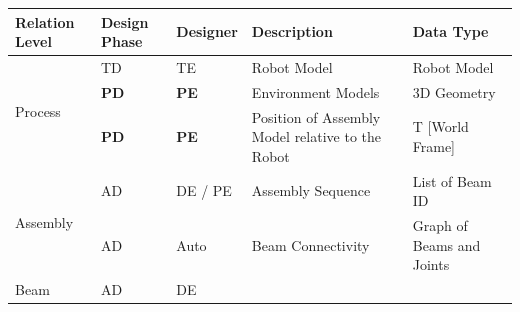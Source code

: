 \documentclass[11pt]{book}
\begin{document}
\begin{table}[H]
\begin{adjustbox}{max width=\textwidth}
\begin{tabular}{p{2.09cm}p{1.51cm}p{1.93cm}p{5.92cm}p{4.48cm}}
\hline
\multicolumn{1}{|p{2.09cm}}{{\footnotesize \textbf{Relation Level}}} & 
\multicolumn{1}{|p{1.51cm}}{{\footnotesize \textbf{Design Phase}}} & 
\multicolumn{1}{|p{1.93cm}}{{\footnotesize \textbf{Designer}}} & 
\multicolumn{1}{|p{5.92cm}}{{\footnotesize \textbf{Description}}} & 
\multicolumn{1}{|p{4.48cm}|}{{\footnotesize \textbf{Data Type}}} \\ 
\hline
\multicolumn{1}{|p{2.09cm}}{\multirow{3}{*}{\parbox{2.09cm}{{\footnotesize Process}}}} & 
\multicolumn{1}{|p{1.51cm}}{{\footnotesize TD}} & 
\multicolumn{1}{|p{1.93cm}}{{\footnotesize TE}} & 
\multicolumn{1}{|p{5.92cm}}{{\footnotesize Robot Model}} & 
\multicolumn{1}{|p{4.48cm}|}{{\footnotesize Robot Model}} \\ 
\hhline{~----}
\multicolumn{1}{|p{2.09cm}}{} & 
\multicolumn{1}{|p{1.51cm}}{{\footnotesize \textbf{PD}}} & 
\multicolumn{1}{|p{1.93cm}}{{\footnotesize \textbf{PE}}} & 
\multicolumn{1}{|p{5.92cm}}{{\footnotesize Environment Models}} & 
\multicolumn{1}{|p{4.48cm}|}{{\footnotesize 3D Geometry}} \\ 
\hhline{~----}
\multicolumn{1}{|p{2.09cm}}{} & 
\multicolumn{1}{|p{1.51cm}}{{\footnotesize \textbf{PD}}} & 
\multicolumn{1}{|p{1.93cm}}{{\footnotesize \textbf{PE}}} & 
\multicolumn{1}{|p{5.92cm}}{{\footnotesize Position of Assembly Model relative to the Robot }} & 
\multicolumn{1}{|p{4.48cm}|}{{\footnotesize T [World Frame]}} \\ 
\hline
\multicolumn{1}{|p{2.09cm}}{\multirow{2}{*}{\parbox{2.09cm}{{\footnotesize Assembly}}}} & 
\multicolumn{1}{|p{1.51cm}}{{\footnotesize AD}} & 
\multicolumn{1}{|p{1.93cm}}{{\footnotesize DE / PE}} & 
\multicolumn{1}{|p{5.92cm}}{{\footnotesize Assembly Sequence}} & 
\multicolumn{1}{|p{4.48cm}|}{{\footnotesize List of Beam ID}} \\ 
\hhline{~----}
\multicolumn{1}{|p{2.09cm}}{} & 
\multicolumn{1}{|p{1.51cm}}{{\footnotesize AD}} & 
\multicolumn{1}{|p{1.93cm}}{{\footnotesize Auto}} & 
\multicolumn{1}{|p{5.92cm}}{{\footnotesize Beam Connectivity}} & 
\multicolumn{1}{|p{4.48cm}|}{{\footnotesize Graph of Beams and Joints}} \\ 
\hline
\multicolumn{1}{|p{2.09cm}}{\multirow{8}{*}{\parbox{2.09cm}{{\footnotesize Beam}}}} & 
\multicolumn{1}{|p{1.51cm}}{{\footnotesize AD}} & 
\multicolumn{1}{|p{1.93cm}}{{\footnotesize DE}} & 

\end{tabular}
\end{adjustbox}
\end{table}
\end{document}
